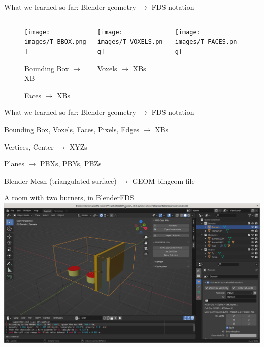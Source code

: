 \documentclass[aspectratio=169]{beamer}
\begin{document}
\begin{frame}[fragile]{What we learned so far:
\linebreak Blender geometry $\rightarrow$ FDS notation}
    \begin{figure}[H]
        \centering
        \begin{columns}[T]
            \begin{column}{.3\linewidth}
                \texttt{[image: images/T\_BBOX.png]}
                \caption{Bounding Box $\rightarrow$ XB}
            \end{column}
            \begin{column}{.3\linewidth}
                \texttt{[image: images/T\_VOXELS.png]}
                \caption{Voxels $\rightarrow$ XBs}
            \end{column}
            \begin{column}{.3\linewidth}
                \texttt{[image: images/T\_FACES.png]}
                \caption{Faces $\rightarrow$ XBs}
            \end{column}
        \end{columns}
    \end{figure}
\end{frame}

\begin{frame}[fragile]{What we learned so far:
\linebreak Blender geometry $\rightarrow$ FDS notation}
    \begin{vfilleditems}
        \item Bounding Box, Voxels, Faces, Pixels, Edges $\rightarrow$ XBs
        \item Vertices, Center $\rightarrow$ XYZs
        \item Planes $\rightarrow$ PBXs, PBYs, PBZs
        \item Blender Mesh (triangulated surface) $\rightarrow$ GEOM bingeom file
    \end{vfilleditems}
\end{frame}

\begin{frame}[fragile]{A room with two burners, in BlenderFDS}
  \centering
  \vfill
  \includegraphics[width=.75\linewidth]{images/blend_case.png}
  \vfill
\end{frame}
\end{document}
